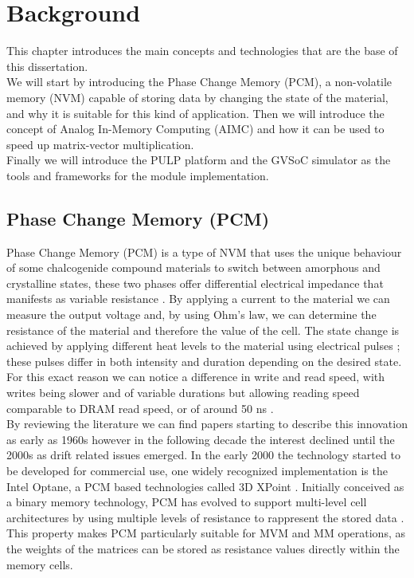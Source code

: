 
\chapter{Background}\label{chap:background}
This chapter introduces the main concepts and technologies that are the base of this dissertation.\\
We will start by introducing the Phase Change Memory (PCM), a non-volatile memory (NVM) capable of storing data by changing the state of the material, 
and why it is suitable for this kind of application.
Then we will introduce the concept of Analog In-Memory Computing (AIMC) and how it can be used to speed up matrix-vector multiplication.\\
Finally we will introduce the PULP platform and the GVSoC simulator as the tools and frameworks for the module implementation.
\newpage
\section{Phase Change Memory (PCM)}\label{sec:pcm}

Phase Change Memory (PCM)  is a type of NVM that uses the unique behaviour of some chalcogenide 
  compound materials to switch between amorphous and crystalline states, 
  these two phases offer differential electrical impedance that manifests as variable resistance \cite{gallo_overview_2020,he_-memory_2023}.
By applying a current to the material we can measure the output voltage and, by using Ohm's law, 
we can determine the resistance of the material and therefore the value of the cell.
The state change is achieved by applying different heat levels to the material using electrical pulses ; 
these pulses differ in both intensity and duration depending on the desired state.
For this exact reason we can notice a difference in write and read speed, 
with writes being slower and of variable durations but allowing reading speed comparable to DRAM read speed, or of around 50 ns \cite{srinivasan_study_2013}.\\

By reviewing the literature we can find papers starting to describe this innovation as early as 1960s however in the following decade the interest 
  declined until the 2000s as drift related issues emerged. In the early 2000 the technology started to be developed for commercial use, one widely recognized implementation is the Intel Optane, a PCM based technologies called 3D XPoint \cite{gallo_overview_2020,he_-memory_2023}.
Initially conceived as a binary memory technology, PCM has evolved to support multi-level cell architectures by using multiple levels of resistance to rappresent the stored data \cite{antolini_readout_2024}.
This property makes PCM particularly suitable for MVM and MM operations, as the weights of the matrices can be stored as resistance values directly within the memory cells.


